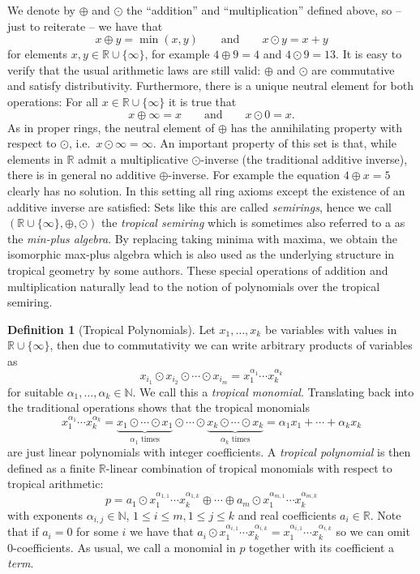 \documentclass[
  paper=a4,
  titlepage,
  bibliography=totoc,
  pagesize=pdftex
]{scrartcl}
\numberwithin{figure}{section}
\numberwithin{equation}{section}
\numberwithin{table}{section}
\newcommand*\setR{\mathds{R}}
\newcommand*\setN{\mathds{N}}
\theoremstyle{definition}
\newtheorem{definition}{Definition}
\numberwithin{definition}{section}
\begin{document}
We denote by $\oplus$ and $\odot$ the \enquote{addition} and \enquote{multiplication}
defined above, so -- just to reiterate -- we have that
\[
  x \oplus y = \min(x,y)
  \qquad \text{and} \qquad
  x \odot y = x+y
\]
for elements $x,y\in \setR\cup\{\infty\}$, for example $4\oplus9 = 4$ and $4\odot9 = 13$.
It is easy to verify that the usual arithmetic laws are still valid: $\oplus$ and $\odot$
are commutative and satisfy distributivity. Furthermore, there is a unique neutral
element for both operations: For all $x\in \setR\cup \{\infty\}$ it is true that
\[
  x \oplus \infty = x
  \qquad \text{and} \qquad
  x \odot 0 = x.
\]
As in proper rings, the neutral element of $\oplus$ has the annihilating property with
respect to $\odot$, i.e.\ $x\odot \infty = \infty$. An important property of this set is
that, while elements in $\setR$ admit a multiplicative $\odot$-inverse (the traditional
additive inverse), there is in general no additive $\oplus$-inverse. For example the
equation $4\oplus x = 5$ clearly has no solution. In this setting all ring axioms except
the existence of an additive inverse are satisfied: Sets like this are called
\emph{semirings}, hence we call $(\setR\cup \{\infty\}, \oplus, \odot)$ the \emph{tropical
semiring} which is sometimes also referred to a as the \emph{min-plus algebra}. By
replacing taking minima with maxima, we obtain the isomorphic max-plus algebra which is
also used as the underlying structure in tropical geometry by some authors. These special
operations of addition and multiplication naturally lead to the notion of polynomials over
the tropical semiring.

\begin{definition}[Tropical Polynomials]
  \label{def:tropPoly}
  Let $x_1, \dots, x_k$ be variables with values in $\setR\cup\{\infty\}$, then due to
  commutativity we can write arbitrary products of variables as
  \[
    x_{i_1} \odot x_{i_2} \odot \cdots \odot x_{i_m}
    = x_1^{\alpha_1} \cdots x_k^{\alpha_k}
  \]
  for suitable $\alpha_1, \dots, \alpha_k \in \setN$. We call this a \emph{tropical
  monomial}. Translating back into the traditional operations shows that the tropical
  monomials
  \[
    x_1^{\alpha_1} \cdots x_k^{\alpha_k} =
    \underbrace{x_1\odot\cdots\odot x_1}_{\alpha_1 \text{ times}}
    \odot\cdots\odot
    \underbrace{x_k\odot\cdots\odot x_k}_{\alpha_k \text{ times}}
    = \alpha_1x_1 + \cdots + \alpha_kx_k
  \]
  are just linear polynomials with integer coefficients. A \emph{tropical polynomial} is
  then defined as a finite $\setR$-linear combination of tropical monomials with respect
  to tropical arithmetic:
  \[
    p = a_1 \odot x_1^{\alpha_{1,1}}\cdots x_k^{\alpha_{1,k}} \oplus \cdots \oplus
    a_m \odot x_1^{\alpha_{m,1}}\cdots x_k^{\alpha_{m,k}}
  \]
  with exponents $\alpha_{i,j} \in \setN$, $1\leq i \leq m, 1\leq j \leq k$ and real
  coefficients $a_i \in \setR$. Note that if $a_i = 0$ for some $i$ we have that $a_i\odot
  x_1^{\alpha_{i,1}}\cdots x_k^{\alpha_{i,k}} = x_1^{\alpha_{i,1}}\cdots
  x_k^{\alpha_{i,k}}$ so we can omit $0$-coefficients. As usual, we call a monomial in $p$
  together with its coefficient a \emph{term}.
\end{definition}
\end{document}
